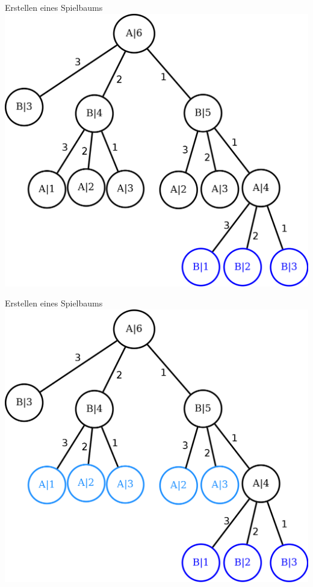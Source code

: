 \documentclass[18pt]{beamer}
\begin{document}
\begin{frame}{Erstellen eines Spielbaums}
\includegraphics[scale=0.4]{baum12.png}
\end{frame}

\begin{frame}{Erstellen eines Spielbaums}
\includegraphics[scale=0.4]{baum13.png}
\end{frame}
\end{document}
